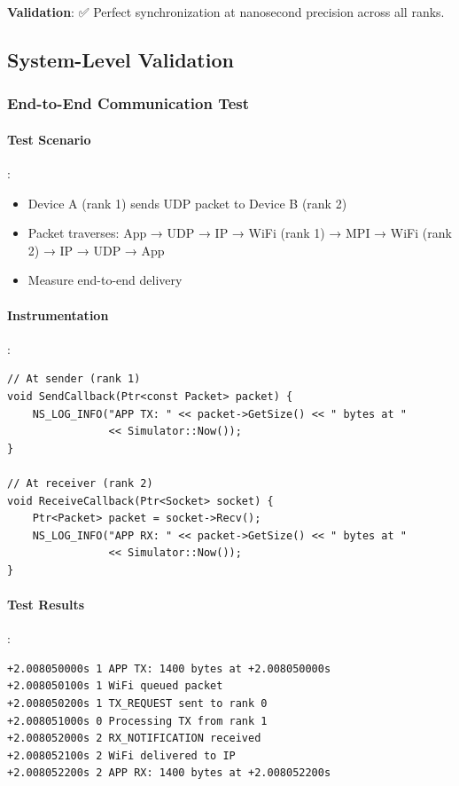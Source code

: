 \textbf{Validation}: ✅ Perfect synchronization at nanosecond precision across all ranks.

\subsection{System-Level Validation}

\subsubsection{End-to-End Communication Test}

\paragraph{Test Scenario}:
\begin{itemize}
    \item Device A (rank 1) sends UDP packet to Device B (rank 2)
    \item Packet traverses: App → UDP → IP → WiFi (rank 1) → MPI → WiFi (rank 2) → IP → UDP → App
    \item Measure end-to-end delivery
\end{itemize}

\paragraph{Instrumentation}:
\begin{lstlisting}[style=cpp]
// At sender (rank 1)
void SendCallback(Ptr<const Packet> packet) {
    NS_LOG_INFO("APP TX: " << packet->GetSize() << " bytes at " 
                << Simulator::Now());
}

// At receiver (rank 2)
void ReceiveCallback(Ptr<Socket> socket) {
    Ptr<Packet> packet = socket->Recv();
    NS_LOG_INFO("APP RX: " << packet->GetSize() << " bytes at " 
                << Simulator::Now());
}
\end{lstlisting}

\paragraph{Test Results}:
\begin{verbatim}
+2.008050000s 1 APP TX: 1400 bytes at +2.008050000s
+2.008050100s 1 WiFi queued packet
+2.008050200s 1 TX_REQUEST sent to rank 0
+2.008051000s 0 Processing TX from rank 1
+2.008052000s 2 RX_NOTIFICATION received
+2.008052100s 2 WiFi delivered to IP
+2.008052200s 2 APP RX: 1400 bytes at +2.008052200s
\end{verbatim}

